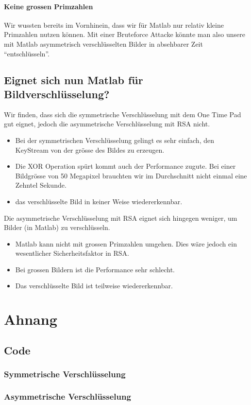 \documentclass[paper=a4,fontsize=12pt]{scrartcl}
\begin{document}
\paragraph{Keine grossen Primzahlen}
Wir wussten bereits im Vornhinein, dass wir für Matlab nur relativ kleine Primzahlen nutzen können.
Mit einer Bruteforce Attacke könnte man also unsere mit Matlab asymmetrisch verschlüsselten Bilder
in absehbarer Zeit "`entschlüsseln"'. 

 
 \subsection{Eignet sich nun Matlab für Bildverschlüsselung?} 
 Wir finden, dass sich die symmetrische Verschlüsselung mit dem One Time Pad
 gut eignet, jedoch die asymmetrische Verschlüsselung mit RSA nicht.
 
 \begin{itemize}
  \item Bei der symmetrischen Verschlüsselung gelingt es sehr einfach, den KeyStream von der
 grösse des Bildes zu erzeugen.
 \item Die XOR Operation spürt kommt auch der Performance zugute. Bei einer Bildgrösse
 von 50 Megapixel brauchten wir im Durchschnitt nicht einmal eine Zehntel Sekunde.
 \item das verschlüsselte Bild in keiner Weise wiedererkennbar.   
\end{itemize}
Die asymmetrische Verschlüsselung mit RSA eignet sich hingegen weniger, um Bilder (in Matlab) zu verschlüsseln.
 \begin{itemize}
  \item Matlab kann nicht mit grossen Primzahlen umgehen. Dies wäre jedoch ein wesentlicher Sicherheitsfaktor in RSA.
  \item Bei grossen Bildern ist die Performance sehr schlecht.
  \item Das verschlüsselte Bild ist teilweise wiedererkennbar.
\end{itemize}
 
 
 
\newpage
\section{Ahnang}
\subsection{Code}
\subsubsection{Symmetrische Verschlüsselung}



\newpage
\subsubsection{Asymmetrische Verschlüsselung}


\end{document}
